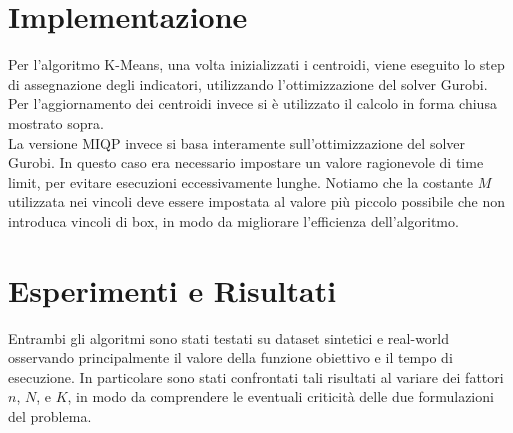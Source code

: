 \documentclass{article}
\begin{document}
    \section{Implementazione}
    Per l'algoritmo K-Means, una volta inizializzati i centroidi, viene eseguito lo step di assegnazione degli indicatori, utilizzando l'ottimizzazione del solver Gurobi. Per l'aggiornamento dei centroidi invece si è utilizzato il calcolo in forma chiusa mostrato sopra.\\
    La versione MIQP invece si basa interamente sull'ottimizzazione del solver Gurobi. In questo caso era necessario impostare un valore ragionevole di time limit, per evitare esecuzioni eccessivamente lunghe. Notiamo che la costante $M$ utilizzata nei vincoli deve essere impostata al valore più piccolo possibile che non introduca vincoli di box, in modo da migliorare l'efficienza dell'algoritmo.\\

    \section{Esperimenti e Risultati}
    Entrambi gli algoritmi sono stati testati su dataset sintetici e real-world osservando principalmente il valore della funzione obiettivo e il tempo di esecuzione. In particolare sono stati confrontati tali risultati al variare dei fattori $n$, $N$, e $K$, in modo da comprendere le eventuali criticità delle due formulazioni del problema.\\
\end{document}
